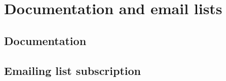 
\section{Documentation and email lists}\label{documentation-and-email-lists}

\subsection{Documentation}\label{documentation}



\subsection{Emailing list subscription}\label{emailing-list-subscription}


